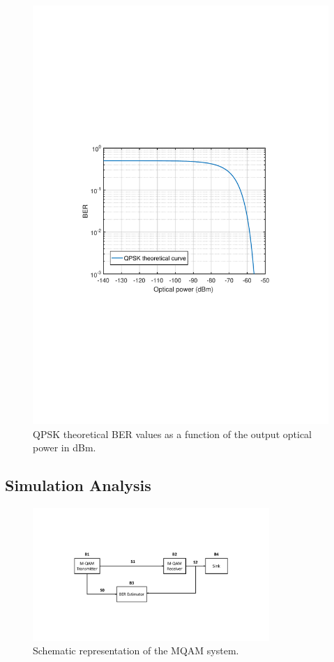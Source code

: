 \begin{figure}[h]
		\centering
		\includegraphics[clip, trim=0.5cm 9cm 0.5cm 9cm, width=\textwidth]{./sdf/m_qam_system/figures/BER_QPSK_theory.pdf}
		\caption{QPSK theoretical BER values as a function of the output optical power in dBm.}
		\label{fig:QPSK_th_curve}
\end{figure}

\pagebreak
\subsection{Simulation Analysis}

\begin{figure}[h]
	\centering
	\includegraphics[width=0.8\textwidth]{./sdf/m_qam_system/figures/MQAM_system_block_diagram}
	\caption{Schematic representation of the MQAM system.}\label{MQAM_system_block_diagram}
\end{figure}

